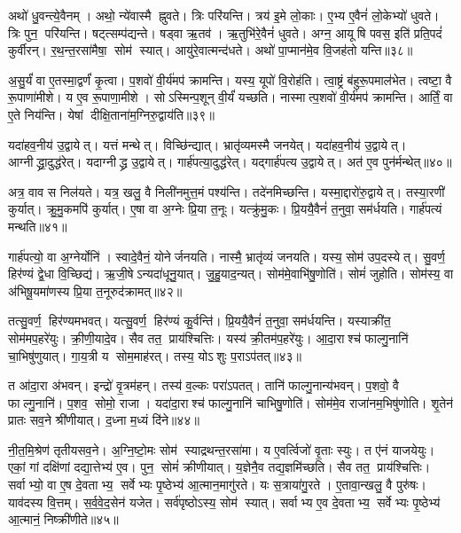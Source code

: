 अथो॑ धु॒वन्त्ये॒वैनम्।
अथो॒ न्ये॑वास्मै ह्नुवते।
त्रिः परि॑यन्ति।
त्रय॑ इ॒मे लो॒काः।
ए॒भ्य ए॒वैनं॑ लो॒केभ्यो॑ धुवते।
त्रिः पुन॒ परि॑यन्ति।
षट्त्सम्प॑द्यन्ते।
षड्वा ऋ॒तव॑।
ऋ॒तुभि॑रे॒वैनं॑ धुवते।
अग्न॒ आयूषि पवस॒ इति॑ प्रति॒पदं॑ कुर्वीरन्।
र॒थ॒न्त॒रसा॑मैषा॒ सोम॑ स्यात्।
आयु॑रे॒वात्मन्द॑धते।
अथो॑ पा॒प्मान॑मे॒व वि॒जह॑तो यन्ति॥३८॥\anuvakamend[अ॒भिजि॑त्यै पृथि॒व्याश्च॒ स्याद॑ध्व॒र्युर्ब्रू॑याल्लो॒कयो॒ परि॑ददति कुर्वीर॒स्त्रीणि॑ च]

अ॒सु॒र्यं॑ वा ए॒तस्मा॒द्वर्णं॑ कृ॒त्वा।
प॒शवो॑ वी॒र्य॑मप॑ क्रामन्ति।
यस्य॒ यूपो॑ वि॒रोह॑ति।
त्वा॒ष्ट्रं ब॑हुरू॒पमाल॑भेत।
त्वष्टा॒ वै रू॒पाणा॑मीशे।
य ए॒व रू॒पाणा॒मीशे।
सोऽस्मिन्प॒शून् वी॒र्यं॑ यच्छति।
नास्मात्प॒शवो॑ वी॒र्य॑मप॑ क्रामन्ति।
आर्तिं॒ वा ए॒ते निय॑न्ति।
येषां दीक्षि॒ताना॑म॒ग्निरु॒द्वाय॑ति॥३९॥

यदा॑हव॒नीय॑ उ॒द्वायेत्।
यत्तं मन्थेत्।
विच्छि॑न्द्यात्।
भ्रातृ॑व्यमस्मै जनयेत्।
यदा॑हव॒नीय॑ उ॒द्वायेत्।
आग्नीद्ध्रा॒दुद्ध॑रेत्।
यदाग्नीद्ध्र उ॒द्वायेत्।
गार्\mbox{}ह॑पत्या॒दुद्ध॑रेत्।
यद्गार्\mbox{}ह॑पत्य उ॒द्वायेत्।
अत॑ ए॒व पुन॑र्मन्थेत्॥४०॥

अत्र॒ वाव स निल॑यते।
यत्र॒ खलु॒ वै निली॑नमुत्त॒मं पश्य॑न्ति।
तदे॑नमिच्छन्ति।
यस्मा॒द्दारो॑रु॒द्वायेत्।
तस्या॒रणी॑ कुर्यात्।
क्रु॒मु॒कमपि॑ कुर्यात्।
ए॒षा वा अ॒ग्नेः प्रि॒या त॒नूः।
यत्क्रु॑मु॒कः।
प्रि॒ययै॒वैनं॑ त॒नुवा॒ सम॑र्धयति।
गार्\mbox{}ह॑पत्यं मन्थति॥४१॥

गार्\mbox{}ह॑पत्यो॒ वा अ॒ग्नेर्योनि॑।
स्वादे॒वैनं॒ योनेर्जनयति।
नास्मै॒ भ्रातृ॑व्यं जनयति।
यस्य॒ सोम॑ उप॒दस्येत्।
सु॒वर्ण॒ हिर॑ण्यं द्वे॒धा वि॒च्छिद्य॑।
ऋ॒जी॒षेऽन्यदा॑धूनु॒यात्।
जु॒हु॒याद॒न्यत्।
सोम॑मे॒वाभि॑षु॒णोति॑।
सोमं॑ जुहोति।
सोम॑स्य॒ वा अ॑भिषू॒यमा॑णस्य प्रि॒या त॒नूरुद॑क्रामत्॥४२॥

तत्सु॒वर्ण॒ हिर॑ण्यमभवत्।
यत्सु॒वर्ण॒ हिर॑ण्यं कु॒र्वन्ति॑।
प्रि॒ययै॒वैनं॑ त॒नुवा॒ सम॑र्धयन्ति।
यस्याक्री॑त॒ सोम॑मप॒हरे॑युः।
क्री॒णी॒यादे॒व।
सैव तत॒ प्राय॑श्चित्तिः।
यस्य॑ क्री॒तम॑प॒हरे॑युः।
आ॒दा॒राश्च॑ फाल्गु॒नानि॑ चा॒भिषु॑णुयात्।
गा॒य॒त्री य सोम॒माह॑रत्।
तस्य॒ योऽशुः प॒राऽप॑तत्॥४३॥

त आ॑दा॒रा अ॑भवन्।
इन्द्रो॑ वृ॒त्रम॑हन्।
तस्य॑ व॒ल्कः परा॑ऽपतत्।
तानि॑ फाल्गु॒नान्य॑भवन्।
प॒शवो॒ वै फाल्गु॒नानि॑।
प॒शव॒ सोमो॒ राजा।
यदा॑दा॒राश्च॑ फाल्गु॒नानि॑ चाभिषु॒णोति॑।
सोम॑मे॒व राजा॑नम॒भिषु॑णोति।
शृ॒तेन॑ प्रातः सव॒ने श्री॑णीयात्।
द॒ध्ना म॒ध्यं दि॑ने॥४४॥

नी॒त॒मि॒श्रेण॑ तृतीयसव॒ने।
अ॒ग्नि॒ष्टो॒मः सोम॑ स्याद्रथन्त॒रसा॑मा।
य ए॒वर्त्विजो॑ वृ॒ताः स्युः।
त ए॑नं याजयेयुः।
एकां॒ गां दक्षि॑णां दद्या॒त्तेभ्य॑ ए॒व।
पुन॒ सोमं॑ क्रीणीयात्।
य॒ज्ञेनै॒व तद्य॒ज्ञमि॑च्छति।
सैव तत॒ प्राय॑श्चित्तिः।
सर्वाभ्यो॒ वा ए॒ष दे॒वताभ्य॒ सर्वेभ्यः पृ॒ष्ठेभ्य॑ आ॒त्मान॒मागु॑रते।
यः स॒त्राया॑गु॒रते।
ए॒तावा॒न्खलु॒ वै पुरु॑षः।
याव॑दस्य वि॒त्तम्।
स॒र्व॒वे॒द॒सेन॑ यजेत।
सर्व॑पृष्ठोऽस्य॒ सोम॑ स्यात्।
सर्वाभ्य ए॒व दे॒वताभ्य॒ सर्वेभ्यः पृ॒ष्ठेभ्य॑ आ॒त्मानं॒ निष्क्री॑णीते॥४५॥\anuvakamend[उ॒द्वाय॑ति मन्थेन्मन्थत्यक्रामत्प॒राऽप॑तन्म॒ध्यन्दि॑न आगु॒रते॒ पञ्च॑ च]

